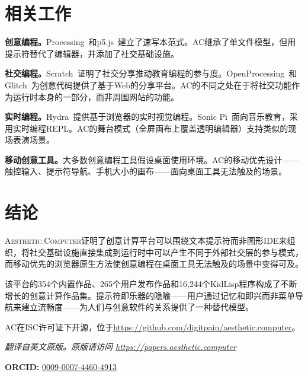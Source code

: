 \documentclass[10pt,letterpaper,twocolumn]{article}
\newcommand{\ac}{\textsc{Aesthetic.Computer}}
\begin{document}

\section{相关工作}

\textbf{创意编程。}Processing~\citep{reas2007processing}和p5.js~\citep{mccarthy2015p5js}建立了速写本范式。AC继承了单文件模型，但用提示符替代了编辑器，并添加了社交基础设施。

\textbf{社交编程。}Scratch~\citep{resnick2009scratch}证明了社交分享推动教育编程的参与度。OpenProcessing~\citep{openprocessing2009}和Glitch~\citep{glitch2017}为创意代码提供了基于Web的分享平台。AC的不同之处在于将社交功能作为运行时本身的一部分，而非周围网站的功能。

\textbf{实时编程。}Hydra~\citep{hydra2019}提供基于浏览器的实时视觉编程。Sonic Pi~\citep{aaron2016sonic}面向音乐教育，采用实时编程REPL。AC的舞台模式（全屏画布上覆盖透明编辑器）支持类似的现场表演场景。

\textbf{移动创意工具。}大多数创意编程工具假设桌面使用环境。AC的移动优先设计——触控输入、提示符导航、手机大小的画布——面向桌面工具无法触及的场景。


\section{结论}

\ac{}证明了创意计算平台可以围绕文本提示符而非图形IDE来组织，将社交基础设施直接集成到运行时中可以产生不同于外部社交层的参与模式，而移动优先的浏览器原生方法使创意编程在桌面工具无法触及的场景中变得可及。

该平台的354个内置作品、265个用户发布作品和16,244个KidLisp程序构成了不断增长的创意计算作品集。提示符即乐器的隐喻——用户通过记忆和即兴而非菜单导航来建立流畅度——为人们与创意软件的关系提供了一种替代模型。

AC在ISC许可证下开源，位于\url{https://github.com/digitpain/aesthetic.computer}。

\vspace{0.5em}
\noindent\textit{翻译自英文原版。原版请访问 \url{https://papers.aesthetic.computer}}

\vspace{0.5em}
\noindent\textbf{ORCID:} \href{https://orcid.org/0009-0007-4460-4913}{0009-0007-4460-4913}




\end{document}
